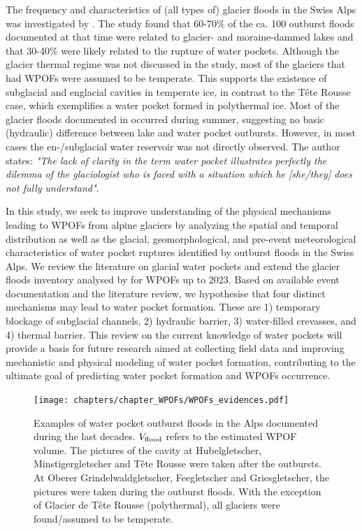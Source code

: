 The frequency and characteristics of (all types of) glacier floods in the Swiss Alps was investigated by \cite{Haeberli1983}. The study found that 60-70\% of the ca. 100 outburst floods documented at that time were related to glacier- and moraine-dammed lakes and that 30-40\% were likely related to the rupture of water pockets. Although the glacier thermal regime was not discussed in the study, most of the glaciers that had WPOFs were assumed to be temperate. This supports the existence of subglacial and englacial cavities in temperate ice, in contrast to the Tête Rousse case, which exemplifies a water pocket formed in polythermal ice. Most of the glacier floods documented in \cite{Haeberli1983} occurred during summer, suggesting no basic (hydraulic) difference between lake and water pocket outbursts. However, in most cases the en-/subglacial water reservoir was not directly observed. The author states: \textit{"The lack of clarity in the term water pocket illustrates perfectly the dilemma of the glaciologist who is faced with a situation which he [she/they] does not fully understand"}. 

In this study, we seek to improve understanding of the physical mechanisms leading to WPOFs from alpine glaciers by analyzing the spatial and temporal distribution as well as the glacial, geomorphological, and pre-event meteorological characteristics of water pocket ruptures identified by outburst floods in the Swiss Alps. We review the literature on glacial water pockets and extend the glacier floods inventory analysed by \citet{Haeberli1983} for WPOFs up to 2023. Based on available event documentation and the literature review, we hypothesise that four distinct mechanisms may lead to water pocket formation. These are 1) temporary blockage of subglacial channels, 2) hydraulic barrier, 3) water-filled crevasses, and 4) thermal barrier. This review on the current knowledge of water pockets will provide a basis for future research aimed at collecting field data and improving mechanistic and physical modeling of water pocket formation, contributing to the ultimate goal of predicting water pocket formation and WPOFs occurrence.

    \begin{figure}
    \centering
    \texttt{[image: chapters/chapter\_WPOFs/WPOFs\_evidences.pdf]}
    \caption{Examples of water pocket outburst floods in the Alps documented during the last decades. $V_{\rm{flood}}$ refers to the estimated WPOF volume. The pictures of the cavity at Hubelgletscher, Minstigergletscher and Tête Rousse were taken after the outbursts. At Oberer Grindelwaldgletscher, Feegletscher and Griesgletscher, the pictures were taken during the outburst floods. With the exception of Glacier de Tête Rousse (polythermal), all glaciers were found/assumed to be temperate.}
    \label{fig:WPOFs_evidences}
\end{figure}

